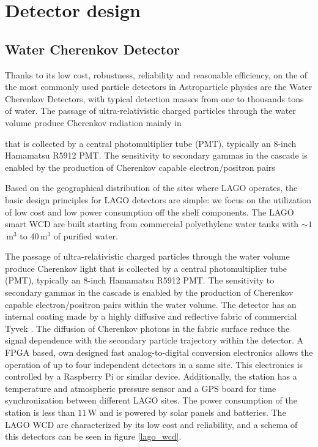 \section{Detector design}\label{sec:detector}


\subsection{Water Cherenkov Detector}

Thanks to its low cost, robustness, reliability and reasonable efficiency, on the of the most commonly used particle detectors in Astroparticle physics are the Water Cherenkov Detectors, with typical detection masses from one to thousands tons of water. The passage of ultra-relativistic charged particles through the water volume produce Cherenkov radiation mainly in 


that is collected by a central photomultiplier tube (PMT), typically an
8-inch Hamamatsu R5912 PMT. The sensitivity to secondary gammas in the cascade
is enabled by the production of Cherenkov capable electron/positron pairs




Based on the geographical distribution of the sites where LAGO operates, the basic design principles for LAGO detectors are simple: we focus on the utilization of low cost and low power consumption off the shelf components. The LAGO smart WCD are built starting from commercial polyethylene water tanks with $\sim 1$\,m$^3$ to $40$\,m$^3$ of purified water. 




The passage of
ultra-relativistic charged particles through the water volume produce Cherenkov
light that is collected by a central photomultiplier tube (PMT), typically an
8-inch Hamamatsu R5912 PMT. The sensitivity to secondary gammas in the cascade
is enabled by the production of Cherenkov capable electron/positron pairs
within the water volume. The detector has an internal coating made by a highly
diffusive and reflective fabric of commercial
Tyvek\textregistered
. The diffusion of
Cherenkov photons in the fabric surface reduce the signal dependence with the
secondary particle trajectory within the detector. A FPGA based, own designed
fast analog-to-digital conversion electronics allows the operation of up to
four independent detectors in a same site. This electronics is controlled by a
Raspberry Pi or similar device. Additionally, the station has a temperature and
atmospheric pressure sensor and a GPS board for time synchronization between
different LAGO sites. The power consumption of the station is less than $11$\,W
and is powered by solar panels and batteries. The LAGO WCD are characterized by
its low cost and reliability, and a schema of this detectors can be seen in
figure \ref{lago_wcd}.





